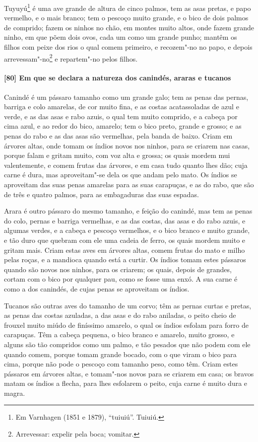 Tuyuyú\footnote{ Em Varnhagen (1851 e 1879), ``tuiuiú''. Tuiuiú.} é uma ave grande de
altura de cinco palmos, tem as asas pretas, e papo vermelho, e o mais branco; tem o
pescoço muito grande, e o bico de dois palmos de comprido; fazem os ninhos no chão, em
montes muito altos, onde fazem grande ninho, em que põem dois ovos, cada um como um grande
punho; mantêm os filhos com peixe dos rios o qual comem primeiro, e recozem"-no no papo, e
depois arrevessam"-no\footnote{ Arrevessar: expelir pela boca; vomitar.} e repartem"-no
pelos filhos.

\paragraph{[80] Em que se declara a natureza dos canindés, araras e tucanos}\quad
Canindé é um pássaro tamanho como um grande galo; tem as penas das pernas, barriga e colo
amarelas, de cor muito fina, e as costas acatassoladas de azul e verde, e as das asas e
rabo azuis, o qual tem muito comprido, e a cabeça por cima azul, e ao redor do bico,
amarelo; tem o bico preto, grande e grosso; e as penas do rabo e as das asas são
vermelhas, pela banda de baixo. Criam em árvores altas, onde tomam os índios novos nos
ninhos, para se criarem nas casas, porque falam e gritam muito, com voz alta e grossa; os
quais mordem mui valentemente, e comem frutas das árvores, e em casa tudo quanto lhes dão;
cuja carne é dura, mas aproveitam"-se dela os que andam pelo mato. Os índios se aproveitam
das suas penas amarelas para as suas carapuças, e as do rabo, que são de três e quatro
palmos, para as embagaduras das suas espadas.

Arara é outro pássaro do mesmo tamanho, e feição do canindé, mas tem as penas do colo,
pernas e barriga vermelhas, e as das costas, das asas e do rabo azuis, e algumas verdes, e
a cabeça e pescoço vermelhos, e o bico branco e muito grande, e tão duro que quebram com
ele uma cadeia de ferro, os quais mordem muito e gritam mais. Criam estas aves em árvores
altas, comem frutas do mato e milho pelas roças, e a mandioca quando está a curtir. Os
índios tomam estes pássaros quando são novos nos ninhos, para os criarem; os quais, depois
de grandes, cortam com o bico por qualquer pau, como se fosse uma enxó. A sua carne é como
a dos canindés, de cujas penas se aproveitam os índios.

Tucanos são outras aves do tamanho de um corvo; têm as pernas curtas e pretas, as penas
das costas azuladas, a das asas e do rabo aniladas, o peito cheio de frouxel muito miúdo
de finíssimo amarelo, o qual os índios esfolam para forro de carapuças. Têm a cabeça
pequena, o bico branco e amarelo, muito grosso, e alguns são tão compridos como um palmo,
e tão pesados que não podem com ele quando comem, porque tomam grande bocado, com o que
viram o bico para cima, porque não pode o pescoço com tamanho peso, como têm. Criam estes
pássaros em árvores altas, e tomam"-nos novos para se criarem em casa; os bravos matam os
índios a flecha, para lhes esfolarem o peito, cuja carne é muito dura e magra.

